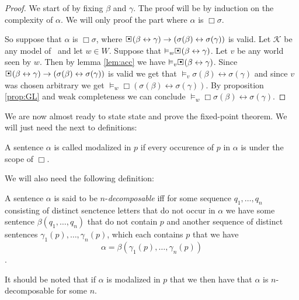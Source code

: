 \documentclass[../main.tex]{subfiles}
\begin{document}
\begin{proof}
	We start of by fixing $\beta$ and $\gamma$. The proof will be by
	induction on the complexity of $\alpha$. We will only proof the part
	where $\alpha$ is $\Box\sigma$.

	So suppose that $\alpha$ is $\Box\sigma$, where
	$\sBox(\beta\leftrightarrow\gamma)\rightarrow(\sigma(\beta)\leftrightarrow\sigma(\gamma))$
	is valid. Let $\mathcal{K}$ be any model of \GL\ and let $w\in W$.
	Suppose that $\vDash_w\sBox(\beta\leftrightarrow\gamma)$. Let $v$ be
	any world seen by $w$. Then by lemma \ref{lem:acc} we have
	$\vDash_v\sBox(\beta\leftrightarrow\gamma)$. Since 
	$\sBox(\beta\leftrightarrow\gamma)\rightarrow(\sigma(\beta)\leftrightarrow\sigma(\gamma))$
	is valid we get that
	$\vDash_v\sigma(\beta)\leftrightarrow\sigma(\gamma)$ and since
	$v$ was chosen arbitrary we get
	$\vDash_w\Box(\sigma(\beta)\leftrightarrow\sigma(\gamma))$. By
	proposition \ref{prop:GL} and weak completeness we can conclude
	$\vDash_w\Box\sigma(\beta)\leftrightarrow\sigma(\gamma)$.
\end{proof}

We are now almost ready to state state and prove the fixed-point theorem. We
will just need the next to definitions:
\begin{defi}
	A sentence $\alpha$ is called modalized in $p$ if every occurence of
	$p$ in  $\alpha$ is under the scope of $\Box$.
\end{defi}
We will also need the following definition:
\begin{defi}
	A sentence $\alpha$ is said to be $n$-\textit{decomposable} iff for some
	sequence $q_1,\ldots,q_n$ consisting of distinct senctence letters that
	do not occur in $\alpha$ we have some sentence $\beta(q_1,\ldots,q_n)$
	that do not contain $p$ and another sequence of distinct sentences 
	$\gamma_1(p),\ldots,\gamma_n(p)$, which each contains $p$ that we have
	$$\alpha=\beta(\gamma_1(p),\ldots,\gamma_n(p))$$.
\end{defi}
It should be noted that if $\alpha$ is modalized in $p$ that we then have that
$\alpha$ is $n$-decomposable for some $n$.
\end{document}
